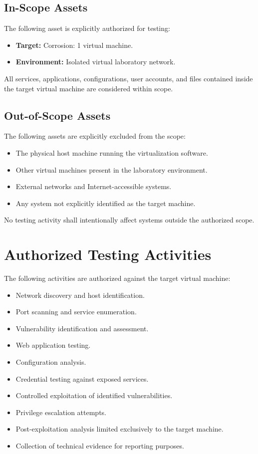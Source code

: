 \subsection{In-Scope Assets}
The following asset is explicitly authorized for testing:

\begin{itemize}
    \item \textbf{Target:} Corrosion: 1 virtual machine.
    \item \textbf{Environment:} Isolated virtual laboratory network.
\end{itemize}

All services, applications, configurations, user accounts, and files contained inside the target virtual machine are considered within scope.

\subsection{Out-of-Scope Assets}
The following assets are explicitly excluded from the scope:

\begin{itemize}
    \item The physical host machine running the virtualization software.
    \item Other virtual machines present in the laboratory environment.
    \item External networks and Internet-accessible systems.
    \item Any system not explicitly identified as the target machine.
\end{itemize}

No testing activity shall intentionally affect systems outside the authorized
scope.


\section{Authorized Testing Activities}
The following activities are authorized against the target virtual machine:

\begin{itemize}
    \item Network discovery and host identification.
    \item Port scanning and service enumeration.
    \item Vulnerability identification and assessment.
    \item Web application testing.
    \item Configuration analysis.
    \item Credential testing against exposed services.
    \item Controlled exploitation of identified vulnerabilities.
    \item Privilege escalation attempts.
    \item Post-exploitation analysis limited exclusively to the target machine.
    \item Collection of technical evidence for reporting purposes.
\end{itemize}

